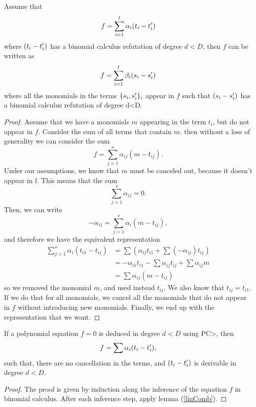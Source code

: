 \documentclass[a4paper,twoside,justified]{tufte-handout}
\begin{document}
\begin{lemma}\label{linComb}
Assume that 
\begin{equation*}
f = \sum_{i=1}^{l} \alpha_i  (t_i-t_i\rq{})
\end{equation*}
where  $(t_i-t_i\rq{})$ has a binomial calculus refutation of degree $d<D$, then $f$ can be written as
\begin{equation*}
f = \sum_{i=1}^{l} \beta_i  (s_i-s_i\rq{})
\end{equation*}
where all the monomials in the terms $\{s_i,s_i\rq{}\}_i$ appear in $f$ such that $(s_i-s_i\rq{})$ has a binomial calculus refutation of degree d<D.
\end{lemma}
\begin{proof}
Assume that we have a monomials $m$ appearing in the term $t_i$, but do not appear in $f$. Consider the sum of all terms that contain $m$. then without a loss of generality we can consider the sum
\begin{equation*}
f = \sum_{j=1}^{s} \alpha_{ij} (m-t_{ij}).
\end{equation*}
Under our assumptions, we know that $m$ must be canceled out, because it doesn\rq{}t appear in f. This means that the sum
\begin{equation*}
\sum_{j=1}^{s} \alpha_{ij} = 0.
\end{equation*}
Then, we can write
\begin{equation*}
-\alpha_{i1} = \sum_{j>1}^{s} \alpha_i (m-t_{ij}),
\end{equation*}
and therefore we have the equivalent representation
\begin{equation*}
\begin{aligned}
 \sum_{j>1}^{s} \alpha_i (t_{i1}-t_{ij}) &=\sum( \alpha_{ij}t_{i1} + \sum(-\alpha_{ij})t_{ij})\\
&= - \alpha_{i1}t_{i1} - \sum \alpha_{ij}t_{ij} + \sum\alpha_{ij} m\\
& = \sum \alpha_{ij} (m - t_{ij})
\end{aligned}
\end{equation*}
so we removed the monomial $m$, and used instead $t_{ij}$. We also know that $t_{ij} = t_{i1}$. If we do that for all monomials, we cancel all the monomials that do not appear in $f$ without introducing new monomials. Finally, we end up with the representation that we want.
\end{proof}


\begin{corollary}
If a polynomial equation $f=0$ is deduced in degree $d<D$ using PC>, then
\begin{equation*}
f = \sum \alpha_i (t_i-t_i\rq{}),
\end{equation*}
such that, there are no cancellation in the terms, and $(t_i-t_i\rq{})$ is derivable in degree $d<D$.
\end{corollary}
\begin{proof}
The proof is given by induction along the inference of the equation $f$ in binomial calculus. After each  inference step, apply lemma (\ref{linComb}).
\end{proof}
\end{document}
